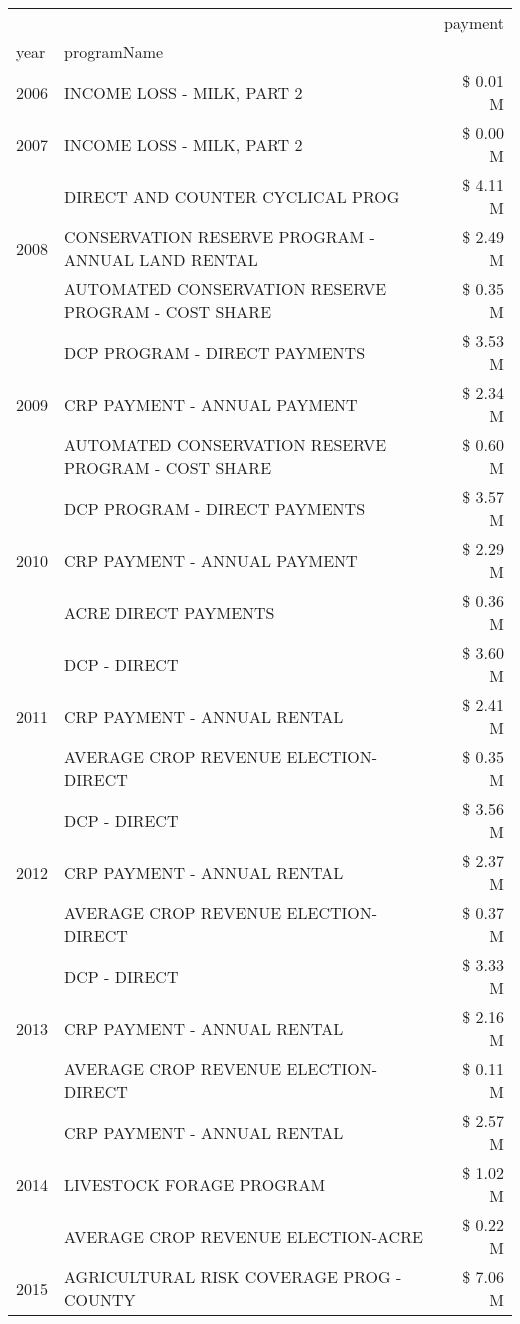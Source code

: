\begin{tabular}{llr}
\toprule
 &  & payment \\
year & programName &  \\
\midrule
2006 & INCOME LOSS - MILK, PART 2 & \$ 0.01 M \\
\cline{1-3}
2007 & INCOME LOSS - MILK, PART 2 & \$ 0.00 M \\
\cline{1-3}
\multirow[t]{3}{*}{2008} & DIRECT AND COUNTER CYCLICAL PROG & \$ 4.11 M \\
 & CONSERVATION RESERVE PROGRAM - ANNUAL LAND RENTAL & \$ 2.49 M \\
 & AUTOMATED CONSERVATION RESERVE PROGRAM - COST SHARE & \$ 0.35 M \\
\cline{1-3}
\multirow[t]{3}{*}{2009} & DCP PROGRAM - DIRECT PAYMENTS & \$ 3.53 M \\
 & CRP PAYMENT - ANNUAL PAYMENT & \$ 2.34 M \\
 & AUTOMATED CONSERVATION RESERVE PROGRAM - COST SHARE & \$ 0.60 M \\
\cline{1-3}
\multirow[t]{3}{*}{2010} & DCP PROGRAM - DIRECT PAYMENTS & \$ 3.57 M \\
 & CRP PAYMENT - ANNUAL PAYMENT & \$ 2.29 M \\
 & ACRE DIRECT PAYMENTS & \$ 0.36 M \\
\cline{1-3}
\multirow[t]{3}{*}{2011} & DCP - DIRECT & \$ 3.60 M \\
 & CRP PAYMENT - ANNUAL RENTAL & \$ 2.41 M \\
 & AVERAGE CROP REVENUE ELECTION-DIRECT & \$ 0.35 M \\
\cline{1-3}
\multirow[t]{3}{*}{2012} & DCP - DIRECT & \$ 3.56 M \\
 & CRP PAYMENT - ANNUAL RENTAL & \$ 2.37 M \\
 & AVERAGE CROP REVENUE ELECTION-DIRECT & \$ 0.37 M \\
\cline{1-3}
\multirow[t]{3}{*}{2013} & DCP - DIRECT & \$ 3.33 M \\
 & CRP PAYMENT - ANNUAL RENTAL & \$ 2.16 M \\
 & AVERAGE CROP REVENUE ELECTION-DIRECT & \$ 0.11 M \\
\cline{1-3}
\multirow[t]{3}{*}{2014} & CRP PAYMENT - ANNUAL RENTAL & \$ 2.57 M \\
 & LIVESTOCK FORAGE PROGRAM & \$ 1.02 M \\
 & AVERAGE CROP REVENUE ELECTION-ACRE & \$ 0.22 M \\
\cline{1-3}
\multirow[t]{3}{*}{2015} & AGRICULTURAL RISK COVERAGE PROG - COUNTY & \$ 7.06 M \\

\end{tabular}
